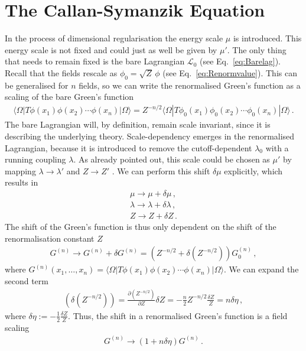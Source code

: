 \section{The Callan-Symanzik Equation}
In the process of dimensional regularisation the energy scale $\mu$ is introduced. This energy scale is not fixed and could just as well be given by $\mu'$. The only thing that needs to remain fixed is the bare Lagrangian $\mathcal{L}_{
\mathrm{0}}$ (see Eq.~\eqref{eq:Barelag}). 
Recall that the fields rescale as $\phi_0 = \sqrt{Z}\,\phi$ (see Eq.~\eqref{eq:Renormvalue}). This can be generalised for $n$ fields, so we can write the renormalised Green's function as a scaling of the bare Green's function
\begin{align}
    \langle \Omega | T\phi(x_1)\phi(x_2)\cdots\phi(x_n) |\Omega \rangle = Z^{-n/2} \langle \Omega | T\phi_0(x_1)\phi_0(x_2)\cdots\phi_0(x_n) |\Omega \rangle\,.
\end{align}
The bare Lagrangian will, by definition, remain scale invariant, since it is describing the underlying theory. Scale-dependency emerges in the renormalised Lagrangian, because it is introduced to remove the cutoff-dependent $\lambda_0$ with a running coupling $\lambda$. As already pointed out, this scale could be chosen as $\mu'$ by mapping $\lambda\to\lambda'$ and $Z\to Z'$ \cite{Peskin:1995ev}. We can perform this shift $\delta\mu$ explicitly, which results in
\begin{align}
    \mu\to \mu+\delta \mu\,,\\\lambda\to\lambda+\delta\lambda\,,\\Z\to Z+\delta Z\,.
\end{align}
The shift of the Green's function is thus only dependent on the shift of the renormalisation constant $Z$
\begin{align}
    G^{(n)}\to G^{(n)}+\delta G^{(n)} = \left(Z^{-n/2}+\delta\left(Z^{-n/2}\right)\right) G_0^{(n)}\,,
\end{align}
where $G^{(n)}(x_1,\dots,x_n)=\langle \Omega | T\phi(x_1)\phi(x_2)\cdots\phi(x_n) |\Omega \rangle $. We can expand the second term
\begin{align}
    \left(\delta\left(Z^{-n/2}\right)\right)= \frac{ \partial \left(Z^{-n/2}\right)}{\partial Z}\delta Z=-\frac{n}{2} Z^{-n/2}\frac{\delta Z}{Z}= n \delta \eta\,, \label{eq:defeta}
\end{align}  
where $\delta\eta:=-\frac{1}{2}\frac{\delta Z}{Z}$. Thus, the shift in a renormalised Green's function is a field scaling 
\begin{align}
    G^{(n)}\to (1+n\delta\eta ) G^{(n)}\,.
\end{align}
